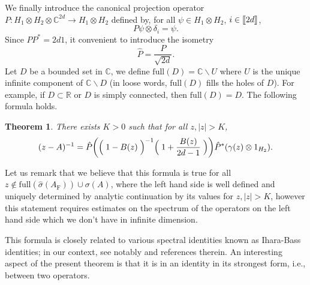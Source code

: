 \documentclass[11pt]{article}
\renewcommand{\star}{{\mathrm{F}}}
\newtheorem{theorem}[lemma]{Theorem}
\newcommand{\dR}{\mathbb {R}}
\newcommand{\dC}{\mathbb {C}}
\newcommand{\FULL}{ \mathrm{full}}
\newcommand{\PAR}[1]{{{\left(#1\right)}}} %
\newcommand{\1}{1\!\!{\sf I}}
\newcommand{\INT}[1]{{{\left[\hspace{-1.4pt}\left[#1\right]\hspace{-1.4pt}\right]}}}
\begin{document}
 We finally introduce the canonical projection operator $ P : H_1 \otimes H_2 \otimes \dC^{2d} \to H_1 \otimes H_2 $ defined by, for all $\psi \in H_1 \otimes H_2$,  $ i \in \INT{2d}$,
 $$
P \psi \otimes \delta_i =  \psi.
$$
Since $P P^*  = 2 d 1$, it convenient to introduce the isometry 
$$
\hat P = \frac{P}{\sqrt{2d}}.
$$
Let $D$ be a bounded set in $\dC$, we define $\FULL( D ) = \dC \backslash U$ where $U$ is the unique infinite component of 
$\dC \backslash D$ (in loose words, $\FULL(D)$ fills the holes of $D$). For example, if $D \subset \dR$ 
or $D$ is simply connected, then $\FULL(D) = D$. The following formula holds. 
\begin{theorem}\label{th:resIB}
There exists $K>0$ such that for all $z, |z|>K$,
$$
(z - A)^{-1} =  \hat P \PAR{ \Bigm(1 - B(z) \Bigm)^{-1} \Bigm(  1 + \frac{B(z)}{2d-1} \Bigm) }  \hat P^*   ( \gamma(z) \otimes 1_{H_2}).
$$
\end{theorem}

Let us remark that we believe that this formula is true for all $ z  \notin  \FULL(\hat \sigma(A_\star)) \cup \sigma(A)$, where the left hand side is well defined and uniquely determined by analytic continuation by its values for $z, |z|>K$, however this statement requires estimates on the spectrum of the operators on the left hand side which we don't have in infinite dimension. 

This formula is closely related to various spectral identities known as Ihara-Bass identities; in our context, see notably \cite{MR1749978,NIPS2009_0420,anantharaman2017relations,MR4024563,MR3961083} and references therein. An interesting aspect of the present theorem is that it is in an identity in its strongest form, i.e., between two operators.
\end{document}
